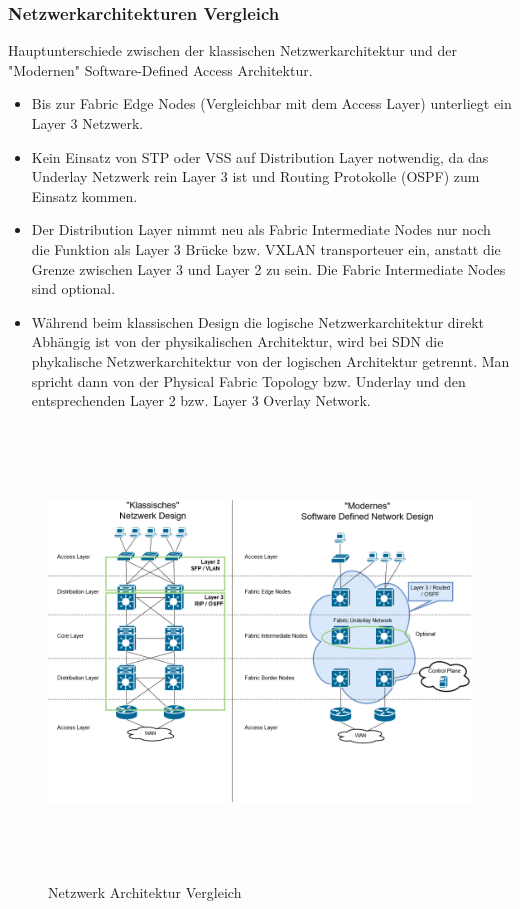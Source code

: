 \subsubsection{Netzwerkarchitekturen Vergleich}
Hauptunterschiede zwischen der klassischen Netzwerkarchitektur und der "Modernen" Software-Defined Access Architektur. 

\begin{itemize}
	\item Bis zur Fabric Edge Nodes (Vergleichbar mit dem Access Layer) unterliegt ein Layer 3 Netzwerk. 
	\item Kein Einsatz von STP oder VSS auf Distribution Layer notwendig, da das Underlay Netzwerk rein Layer 3 ist und Routing Protokolle (OSPF) zum Einsatz kommen.
	\item Der Distribution Layer nimmt neu als Fabric Intermediate Nodes nur noch die Funktion als Layer 3 Brücke bzw. VXLAN transporteuer ein, anstatt die Grenze zwischen Layer 3 und Layer 2 zu sein. Die Fabric Intermediate Nodes sind optional. 
	\item Während beim klassischen Design die logische Netzwerkarchitektur direkt Abhängig ist von der physikalischen Architektur, wird bei SDN die phykalische Netzwerkarchitektur von der logischen Architektur getrennt. Man spricht dann von der Physical Fabric Topology bzw. Underlay und den entsprechenden Layer 2 bzw. Layer 3 Overlay Network. 
\end{itemize}

\begin{figure}[H]
	\centering
	\includegraphics[height=12cm]{img/LabNetworkArchitecture_Vergleich.png}
	\caption{Netzwerk Architektur Vergleich}
	\label{fig:LabNetworkArchitectureVergleich}
\end{figure}